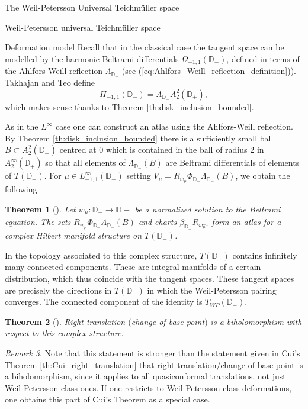 \documentclass[12pt]{amsart}
\newcommand{\disk}{\ensuremath{\mathbb{D}} } %
\theoremstyle{plain}
\newtheorem{theorem}{Theorem}[section]
\theoremstyle{definition}
\theoremstyle{remark}
\newtheorem{remark}[theorem]{Remark}
\numberwithin{equation}{section} %
\numberwithin{figure}{section} %
\begin{document}
\begin{section}{The Weil-Petersson Universal Teichm\"uller space}
\begin{subsection}{Weil-Petersson universal Teichm\"uller space}
\begin{subsubsection}{{\underline{Deformation model}}}
 Recall that in the classical case the tangent space can be modelled by the harmonic Beltrami differentials $\Omega_{-1,1}(\disk_-)$, defined in terms of the Ahlfors-Weill reflection $\Lambda_{\disk_-}$ (see (\ref{eq:Ahlfors_Weill_reflection_definition})).   Takhajan and Teo define 
 \begin{equation}\label{TTs H-class}
    H_{-1,1}(\disk_-) =  \Lambda_{\disk_-} A_2^2(\disk_+), 
 \end{equation} 
 which makes sense thanks to Theorem \ref{th:disk_inclusion_bounded}.
 
  As in the $L^\infty$ case one can construct an atlas using the Ahlfors-Weill reflection. By Theorem \ref{th:disk_inclusion_bounded} there is a sufficiently small ball $B \subset A_2^2(\disk_+)$ centred at $0$ which is contained in the ball of radius $2$ in $A_2^\infty(\disk_+)$ so that all elements of $\Lambda_{\disk_-}(B)$ are Beltrami differentials of elements of $T(\disk_-)$. For $\mu \in L_{-1,1}^\infty(\disk_-)$ setting $V_\mu = R_{w_\mu} \Phi_{\disk_-} \Lambda_{\disk_-}(B)$, we obtain the following.
 \begin{theorem}[\cite{Takhtajan_Teo_Memoirs}]  Let $w_\mu:\disk_- \rightarrow \disk-$ be a normalized solution to the Beltrami equation. The sets $R_{w_\mu} \Phi_{\disk_-} \Lambda_{\disk_-}(B)$ and charts $\beta_{\disk_-} R_{w_\mu^{-1}}$ form an atlas for a complex Hilbert manifold structure on $T(\disk_-)$.   
 \end{theorem} 
 
 In the topology associated to this complex structure, $T(\disk_-)$ contains infinitely many connected components. These are integral manifolds of a certain distribution, which thus coincide with the tangent spaces. These tangent spaces are precisely the directions in $T(\disk_-)$ in which the Weil-Petersson pairing converges. The connected component of the identity is $T_{WP}(\disk_-)$. 


 \begin{theorem}[\cite{Takhtajan_Teo_Memoirs}]  Right translation $($change of base point$)$ is a biholomorphism with respect to this complex structure. 
 \end{theorem} 
 
 
   \begin{remark} Note that this statement is stronger than the statement given in Cui's Theorem \ref{th:Cui_right_translation} that right translation/change of base point is a biholomorphism, since it applies to all quasiconformal translations, not just Weil-Petersson class ones. If one restricts to Weil-Petersson class deformations, one obtains this part of Cui's Theorem as a special case.  
    

\end{remark}
\end{subsubsection}
\end{subsection}
\end{section}
\end{document}
